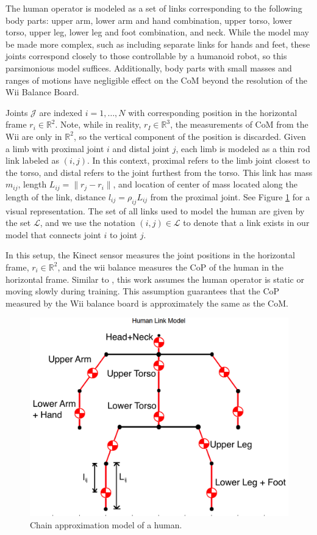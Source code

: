 \label{prelim}
The human operator is modeled as a set of links corresponding to the following body parts: upper arm, lower arm and hand combination, upper torso, lower torso, upper leg, lower leg and foot combination, and neck. While the model may be made more complex, such as including separate links for hands and feet, these joints correspond closely to those controllable by a humanoid robot, so this parsimonious model suffices. Additionally, body parts with small masses and ranges of motions have negligible effect on the CoM beyond the resolution of the Wii Balance Board.

Joints $\mathcal{J}$ are indexed $i = 1,\hdots, N$ with corresponding position in the horizontal frame $r_i \in \mathbb{R}^2$. Note, while in reality, $r_I\in \mathbb{R}^3$, the measurements of CoM from the Wii are only in $\mathbb{R}^2$, so the vertical component of the position is discarded. Given a limb with proximal joint $i$ and distal joint $j$, each limb is modeled as a thin rod link labeled as $(i,j)$. In this context, proximal refers to the limb joint closest to the torso, and distal refers to the joint furthest from the torso. This link has mass $m_{ij}$, length $L_{ij} = \|r_{j}-r_i\|$, and location of center of mass located along the length of the link, distance $l_{ij}=\rho_{ij} L_{ij}$ from the proximal joint. See Figure \ref{fig:humanmodel} for a visual representation. The set of all links used to model the human are given by the set $\mathcal{L}$, and we use the notation $(i,j) \in \mathcal{L}$ to denote that a link exists in our model that connects joint $i$ to joint $j$.

In this setup, the Kinect sensor measures the joint positions in the horizontal frame, $r_i \in \mathbb{R}^2$, and the wii balance measures the CoP of the human in the horizontal frame. Similar to \cite{gonzalez2012estimation,cotton2011estimation}, this work assumes the human operator is static or moving slowly during training. This assumption guarantees that the CoP measured by the Wii balance board is approximately the same as the CoM. 


\begin{figure}
\includegraphics[width=0.9\columnwidth]{figures/skeleton3.png}
\caption{Chain approximation model of a human.}
\label{fig:humanmodel}
\end{figure}

